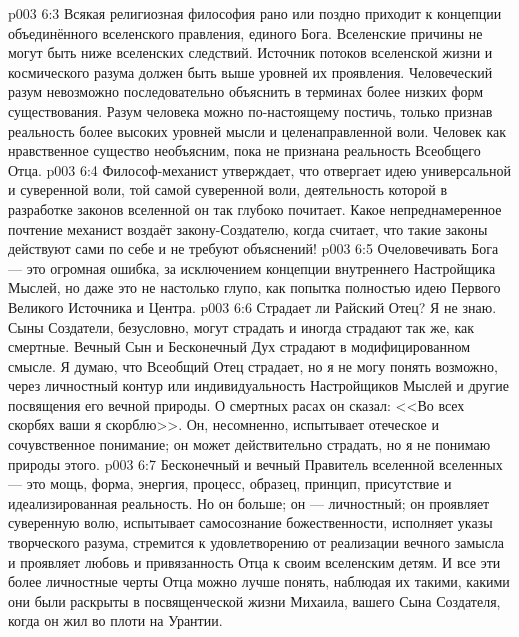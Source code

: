 \vs p003 6:3 \pc Всякая религиозная философия рано или поздно приходит к концепции объединённого вселенского правления, единого Бога. Вселенские причины не могут быть ниже вселенских следствий. Источник потоков вселенской жизни и космического разума должен быть выше уровней их проявления. Человеческий разум невозможно последовательно объяснить в терминах более низких форм существования. Разум человека можно по\hyp{}настоящему постичь, только признав реальность более высоких уровней мысли и целенаправленной воли. Человек как нравственное существо необъясним, пока не признана реальность Всеобщего Отца.
\vs p003 6:4 Философ\hyp{}механист утверждает, что отвергает идею универсальной и суверенной воли, той самой суверенной воли, деятельность которой в разработке законов вселенной он так глубоко почитает. Какое непреднамеренное почтение механист воздаёт закону\hyp{}Создателю, когда считает, что такие законы действуют сами по себе и не требуют объяснений!
\vs p003 6:5 Очеловечивать Бога --- это огромная ошибка, за исключением концепции внутреннего Настройщика Мыслей, но даже это не настолько глупо, как попытка полностью  идею Первого Великого Источника и Центра.
\vs p003 6:6 \pc Страдает ли Райский Отец? Я не знаю. Сыны Создатели, безусловно, могут страдать и иногда страдают так же, как смертные. Вечный Сын и Бесконечный Дух страдают в модифицированном смысле. Я думаю, что Всеобщий Отец страдает, но я не могу понять  возможно, через личностный контур или индивидуальность Настройщиков Мыслей и другие посвящения его вечной природы. О смертных расах он сказал: <<Во всех скорбях ваши я скорблю>>. Он, несомненно, испытывает отеческое и сочувственное понимание; он может действительно страдать, но я не понимаю природы этого.
\vs p003 6:7 \pc Бесконечный и вечный Правитель вселенной вселенных --- это мощь, форма, энергия, процесс, образец, принцип, присутствие и идеализированная реальность. Но он больше; он --- личностный; он проявляет суверенную волю, испытывает самосознание божественности, исполняет указы творческого разума, стремится к удовлетворению от реализации вечного замысла и проявляет любовь и привязанность Отца к своим вселенским детям. И все эти более личностные черты Отца можно лучше понять, наблюдая их такими, какими они были раскрыты в посвященческой жизни Михаила, вашего Сына Создателя, когда он жил во плоти на Урантии.
